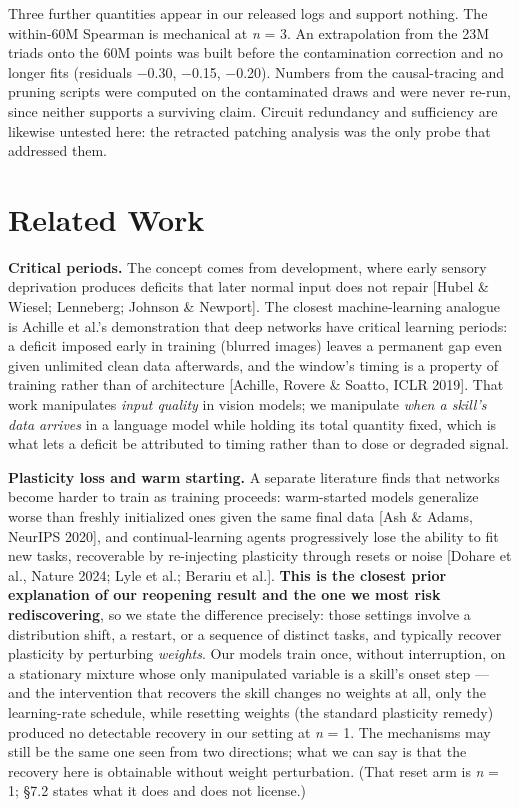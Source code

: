 \documentclass{article}
\begin{document}
Three further quantities appear in our released logs and support nothing. The within-60M
Spearman is mechanical at \emph{n} = 3. An extrapolation from the 23M triads onto the 60M points
was built before the contamination correction and no longer fits (residuals −0.30, −0.15,
−0.20). Numbers from the causal-tracing and pruning scripts were computed on the contaminated
draws and were never re-run, since neither supports a surviving claim. Circuit redundancy and
sufficiency are likewise untested here: the retracted patching analysis was the only probe
that addressed them.

\section{Related Work}\label{related-work}

\textbf{Critical periods.} The concept comes from development, where early sensory deprivation
produces deficits that later normal input does not repair {[}Hubel \& Wiesel; Lenneberg;
Johnson \& Newport{]}. The closest machine-learning analogue is Achille et al.'s demonstration
that deep networks have critical learning periods: a deficit imposed early in training
(blurred images) leaves a permanent gap even given unlimited clean data afterwards, and the
window's timing is a property of training rather than of architecture {[}Achille, Rovere \&
Soatto, ICLR 2019{]}. That work manipulates \emph{input quality} in vision models; we manipulate
\emph{when a skill's data arrives} in a language model while holding its total quantity fixed,
which is what lets a deficit be attributed to timing rather than to dose or degraded signal.

\textbf{Plasticity loss and warm starting.} A separate literature finds that networks become
harder to train as training proceeds: warm-started models generalize worse than freshly
initialized ones given the same final data {[}Ash \& Adams, NeurIPS 2020{]}, and continual-learning
agents progressively lose the ability to fit new tasks, recoverable by re-injecting
plasticity through resets or noise {[}Dohare et al., Nature 2024; Lyle et al.; Berariu et al.{]}.
\textbf{This is the closest prior explanation of our reopening result and the one we most risk
rediscovering}, so we state the difference precisely: those settings involve a distribution
shift, a restart, or a sequence of distinct tasks, and typically recover plasticity by
perturbing \emph{weights}. Our models train once, without interruption, on a stationary mixture
whose only manipulated variable is a skill's onset step --- and the intervention that recovers
the skill changes no weights at all, only the learning-rate schedule, while resetting weights
(the standard plasticity remedy) produced no detectable recovery in our setting at \emph{n} = 1.
The mechanisms may still be the same one seen from two directions; what we can say is that
the recovery here is obtainable without weight perturbation. (That reset arm is \emph{n} = 1;
§7.2 states what it does and does not license.)
\end{document}
